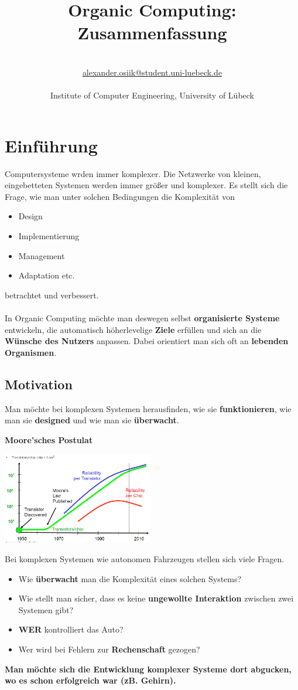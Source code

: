 \documentclass[a4paper]{article}
\title{\textbf{Organic Computing:\\ Zusammenfassung}}\let\Title\@title
\author{\AuthorName\\
	\href{mailto:alexander.osiik@student.uni-luebeck.de}{alexander.osiik@student.uni-luebeck.de}\\
	\small \seminar\\
	\small Institute of Computer Engineering, University of L\"ubeck\\
}\let\Author\@author
\begin{document}
	\maketitle
\section{Einführung}
Computersysteme wrden immer komplexer. Die Netzwerke von kleinen, eingebetteten Systemen werden immer größer und komplexer. Es stellt sich die Frage, wie man unter solchen Bedingungen die Komplexität von
\begin{itemize}
	\item Design
	\item Implementierung
	\item Management
	\item Adaptation etc.
\end{itemize}
betrachtet und verbessert.\\
\\
In Organic Computing möchte man deswegen selbst \textbf{organisierte Systeme} entwickeln, die automatisch höherlevelige \textbf{Ziele} erfüllen und sich an die \textbf{Wünsche des Nutzers} anpassen. Dabei orientiert man sich oft an \textbf{lebenden Organismen}.
\subsection{Motivation}
Man möchte bei komplexen Systemen herausfinden, wie sie \textbf{funktionieren}, wie man sie \textbf{designed} und wie man sie \textbf{überwacht}.

\textbf{Moore'sches Postulat}
\begin{center}
	\includegraphics[height = 4cm]{Moore.png}
\end{center}
Bei komplexen Systemen wie autonomen Fahrzeugen stellen sich viele Fragen.
\begin{itemize}
	\item Wie \textbf{überwacht} man die Komplexität eines solchen Systems?
	\item Wie stellt man sicher, dass es keine \textbf{ungewollte Interaktion} zwischen zwei Systemen gibt?
	\item \textbf{WER} kontrolliert das Auto?
	\item Wer wird bei Fehlern zur \textbf{Rechenschaft} gezogen?
\end{itemize}
\textbf{Man möchte sich die Entwicklung komplexer Systeme dort abgucken, wo es schon erfolgreich war (zB. Gehirn).}\\
\end{document}
